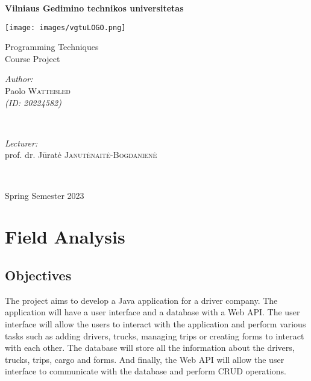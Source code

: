 \documentclass{article}
\begin{document}
\begin{titlepage}
    \begin{center}
        \Huge
        \textbf{Vilniaus Gedimino technikos universitetas}
        \vspace{1.2cm}
         
        \texttt{[image: images/vgtuLOGO.png]}   
        \vspace{1cm}
            
        \Huge
        Programming Techniques \\ Course Project
            
        \vspace{3cm}
     \end{center}  

    \begin{minipage}{0.35\textwidth}
        \begin{flushleft} \large    
        \emph{Author:}\\
        Paolo \textsc{Wattebled} \\ \textit{(ID: 20224582)} \\
        \end{flushleft}
        \end{minipage}
        ~
        \begin{minipage}{0.5\textwidth}
        \begin{flushright} \large
        \emph{Lecturer:} \\
        prof. dr. Jūratė \textsc{Janutėnaitė-Bogdanienė} \\
        \end{flushright}
    \end{minipage}\\[1cm]

\begin{center}
    \Large
    Spring Semester 2023
\end{center}
\end{titlepage}

\newpage
\tableofcontents
\newpage

\section{Field Analysis}

\subsection{Objectives}
The project aims to develop a Java application for a driver company. The application will have 
a user interface and a database with a Web API. The user interface will allow the users 
to interact with the application and perform various tasks such as adding drivers, trucks, 
managing trips or creating forms to interact with each other. The database will store all
the information about the drivers, trucks, trips, cargo and forms. And finally, the Web API will 
allow the user interface to communicate with the database and perform CRUD operations.
\end{document}
